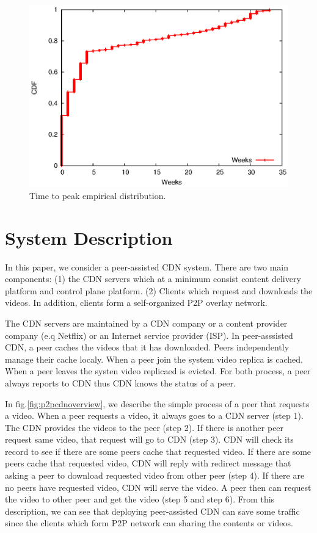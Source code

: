 \documentclass[conference]{IEEEtran}
\begin{document}
\begin{figure}[th]
\begin{center}
\includegraphics[scale=0.6]{graphs/timetopeak.eps}
\end{center}
\caption{Time to peak empirical distribution.}
\label{fig:timetopeak}
\vspace{-2mm}
\end{figure} 

\section{System Description}\label{systemdescription}
In this paper, we consider a peer-assisted CDN system. 
There are two main components: (1) the CDN servers which at a minimum consist content delivery platform and control plane platform. 
(2) Clients which request and downloads the videos.
In addition, clients form a self-organized P2P overlay network.

The CDN servers are maintained by a CDN company or a content provider company (e.q Netflix) or an Internet service provider (ISP).
In peer-asssisted CDN, a peer caches the videos that it has downloaded.
Peers independently manage their cache localy.
When a peer join the system video replica is cached.
When a peer leaves the systen video replicaed is evicted. 
For both process, a peer always reports to CDN thus CDN knows the status of a peer.

In fig.\ref{fig:p2pcdnoverview}, we describe the simple process of a peer that requests a video.  
When a peer requests a video, it always goes to a CDN server (step 1). 
The CDN provides the videos to the peer (step 2). 
If there is another peer request same video, that request will go to CDN (step 3).  
CDN will check its record to see if there are some peers cache that requested video.  
If there are some peers cache that requested video, CDN will reply with redirect message that asking a peer to download requested video from other peer (step 4).
If there are no peers have requested video, CDN will serve the video.   
A peer then can request the video to other peer and get the video (step 5 and step 6).
From this description, we can see that deploying peer-assisted CDN can save some traffic since the clients which form P2P network can sharing the contents or videos. 
\end{document}
